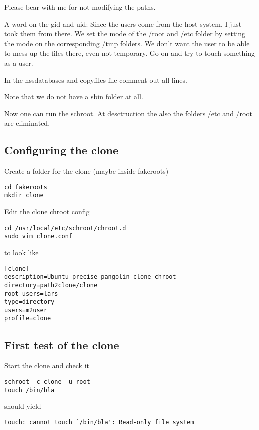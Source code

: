 \documentclass[a4paper]{book}
\begin{document}
Please bear with me for not modifying the paths.

A word on the gid and uid: Since the users come from the host system, I just
took them from there.  We set the mode of the /root and /etc folder by setting
the mode on the corresponding /tmp folders.  We don't want the user to be able
to mess up the files there, even not temporary. Go on and try to touch
something as a user.

In the nssdatabases and copyfiles file comment out all lines.

Note that we do not have a sbin folder at all.

Now one can run the schroot. At desctruction the also the folders /etc and
/root are eliminated.

\subsection{Configuring the clone}

Create a folder for the clone (maybe inside fakeroots)

\begin{verbatim}
cd fakeroots
mkdir clone
\end{verbatim}

Edit the clone chroot config

\begin{verbatim}
cd /usr/local/etc/schroot/chroot.d
sudo vim clone.conf
\end{verbatim}

to look like

\begin{verbatim}
[clone]
description=Ubuntu precise pangolin clone chroot
directory=path2clone/clone
root-users=lars
type=directory
users=m2user
profile=clone
\end{verbatim}

\subsection{First test of the clone}

Start the clone and check it

\begin{verbatim}
schroot -c clone -u root
touch /bin/bla
\end{verbatim}

should yield

\begin{verbatim}
touch: cannot touch `/bin/bla': Read-only file system
\end{verbatim}
\end{document}
